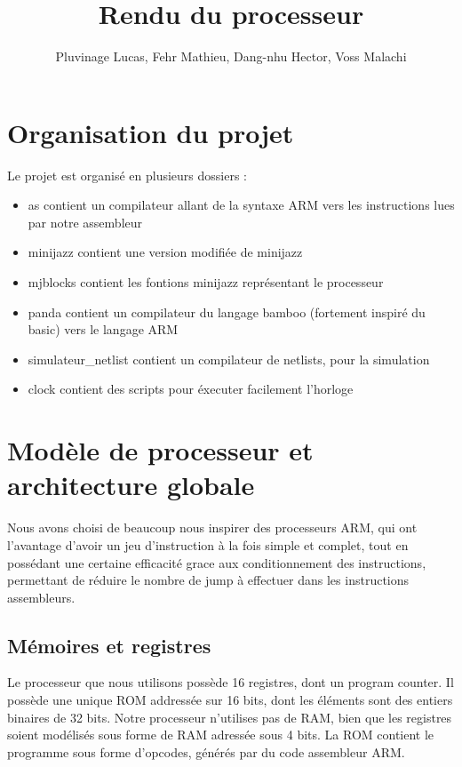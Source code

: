 \documentclass[a4paper]{article}
\title{Rendu du processeur}
\author{Pluvinage Lucas, Fehr Mathieu, Dang-nhu Hector, Voss Malachi}
\begin{document}
\maketitle

\section{Organisation du projet}

Le projet est organisé en plusieurs dossiers :
\begin{itemize}
  \item as contient un compilateur allant de la syntaxe ARM vers les
    instructions lues par notre assembleur
  \item minijazz contient une version modifiée de minijazz
  \item mjblocks contient les fontions minijazz représentant le processeur
  \item panda contient un compilateur du langage bamboo (fortement inspiré du
    basic) vers le langage ARM
  \item simulateur\_netlist contient un compilateur de netlists, pour la
    simulation
  \item clock contient des scripts pour éxecuter facilement l'horloge 
\end{itemize}

\section{Modèle de processeur et architecture globale}

Nous avons choisi de beaucoup nous inspirer des processeurs ARM, qui ont
l'avantage d'avoir un jeu d'instruction à la fois simple et complet, tout en
possédant une certaine efficacité grace aux conditionnement des instructions,
permettant de réduire le nombre de jump à effectuer dans les instructions
assembleurs.

\subsection{Mémoires et registres}

Le processeur que nous utilisons possède 16 registres, dont un program counter.
Il possède une unique ROM addressée sur 16 bits, dont les éléments sont des
entiers binaires de 32 bits. Notre processeur n'utilises pas de RAM, bien que
les registres soient modélisés sous forme de RAM adressée sous 4 bits.
La ROM contient le programme sous forme d'opcodes, générés par du code
assembleur ARM.
\end{document}
